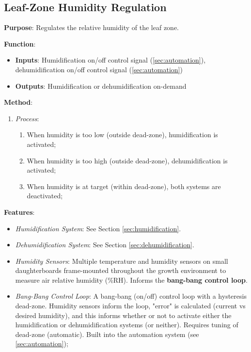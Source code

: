 \subsection{Leaf-Zone Humidity Regulation}
\label{sec:humidityregulation}

\textbf{Purpose}: Regulates the relative humidity of the leaf zone.

\textbf{Function}:
\begin{itemize}
    \item \textbf{Inputs}: Humidification on/off control signal (\ref{sec:automation}), dehumidification on/off control signal (\ref{sec:automation})
    \item \textbf{Outputs}: Humidification or dehumidification on-demand
\end{itemize}

\textbf{Method}:
\begin{enumerate}
    \item \textit{Process}:
    \begin{enumerate}
        \item When humidity is too low (outside dead-zone), humidification is activated;
        \item When humidity is too high (outside dead-zone), dehumidification is activated;
        \item When humidity is at target (within dead-zone), both systems are deactivated;
    \end{enumerate}
\end{enumerate}

\textbf{Features}:
\begin{itemize}
    \item \textit{Humidification System}: See Section \ref{sec:humidification}.
    \item \textit{Dehumidification System}: See Section \ref{sec:dehumidification}.
    \item \textit{Humidity Sensors}: Multiple temperature and humidity sensors \cite{sht31} on small daughterboards frame-mounted throughout the growth environment to measure air relative humidity (\%RH). Informs the \textbf{bang-bang control loop}.
    \item \textit{Bang-Bang Control Loop}: A bang-bang (on/off) control loop with a hysteresis dead-zone. Humidity sensors inform the loop, "error" is calculated (current vs desired humidity), and this informs whether or not to activate either the humidification or dehumidification systems (or neither). Requires tuning of dead-zone (automatic). Built into the automation system (see \ref{sec:automation});
\end{itemize}

